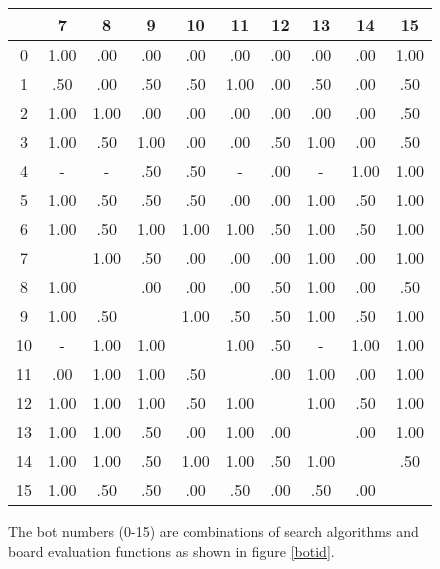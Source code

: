 \begin{figure}
\centering
\begin{tabular}{ | c |  c  c  c  c  c  c  c  c  c  | }
\hline
   &  7   &  8   &  9   &  10  &  11  &  12  &  13  &  14  &  15  \\
\hline
0  & 1.00 &  .00 &  .00 &  .00 &  .00 &  .00 &  .00 &  .00 & 1.00 \\
1  &  .50 &  .00 &  .50 &  .50 & 1.00 &  .00 &  .50 &  .00 &  .50 \\
2  & 1.00 & 1.00 &  .00 &  .00 &  .00 &  .00 &  .00 &  .00 &  .50 \\
3  & 1.00 &  .50 & 1.00 &  .00 &  .00 &  .50 & 1.00 &  .00 &  .50 \\
4  &    - &    - &  .50 &  .50 &    - &  .00 &    - & 1.00 & 1.00 \\
5  & 1.00 &  .50 &  .50 &  .50 &  .00 &  .00 & 1.00 &  .50 & 1.00 \\
6  & 1.00 &  .50 & 1.00 & 1.00 & 1.00 &  .50 & 1.00 &  .50 & 1.00 \\
7  &      & 1.00 &  .50 &  .00 &  .00 &  .00 & 1.00 &  .00 & 1.00 \\
8  & 1.00 &      &  .00 &  .00 &  .00 &  .50 & 1.00 &  .00 &  .50 \\
9  & 1.00 &  .50 &      & 1.00 &  .50 &  .50 & 1.00 &  .50 & 1.00 \\
10 &    - & 1.00 & 1.00 &      & 1.00 &  .50 &    - & 1.00 & 1.00 \\
11 &  .00 & 1.00 & 1.00 &  .50 &      &  .00 & 1.00 &  .00 & 1.00 \\
12 & 1.00 & 1.00 & 1.00 &  .50 & 1.00 &      & 1.00 &  .50 & 1.00 \\
13 & 1.00 & 1.00 &  .50 &  .00 & 1.00 &  .00 &      &  .00 & 1.00 \\
14 & 1.00 & 1.00 &  .50 & 1.00 & 1.00 &  .50 & 1.00 &      &  .50 \\
15 & 1.00 &  .50 &  .50 &  .00 &  .50 &  .00 &  .50 &  .00 &      \\
\hline
\end{tabular}
\caption{The bot numbers (0-15) are combinations of search algorithms
  and board evaluation functions as shown in figure \ref{botid}.}
\label{stats2}
\end{figure}


